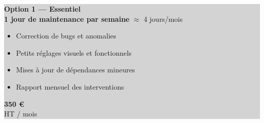 \documentclass[a4paper,11pt]{article}
\begin{document}
\colorbox{lightgray}{\parbox{\textwidth}{
  \vspace{6pt}
  \begin{minipage}{0.72\textwidth}
    \textbf{\color{primary}\large Option 1 — Essentiel}\\[3pt]
    \textbf{1 jour de maintenance par semaine} $\approx$ 4 jours/mois\\[4pt]
    \begin{itemize}[leftmargin=*, noitemsep, topsep=2pt]
      \item Correction de bugs et anomalies
      \item Petits réglages visuels et fonctionnels
      \item Mises à jour de dépendances mineures
      \item Rapport mensuel des interventions
    \end{itemize}
  \end{minipage}
  \hfill
  \begin{minipage}{0.24\textwidth}
    \centering
    \colorbox{primary}{\parbox{0.9\textwidth}{
      \centering\color{white}\vspace{4pt}
      {\large\bfseries 350 €}\\{\small HT / mois}
      \vspace{4pt}
    }}
  \end{minipage}
  \vspace{6pt}
}}

\vspace{6pt}
\end{document}
